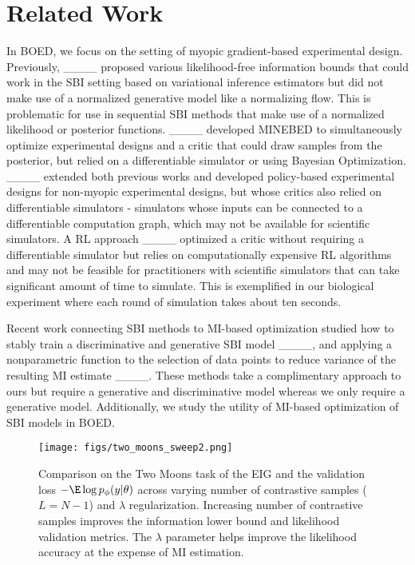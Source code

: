 \section{Related Work}
\label{sec:related_work}

In BOED, we focus on the setting of myopic gradient-based experimental design. Previously, ____ proposed various likelihood-free information bounds that could work in the SBI setting based on variational inference estimators but did not make use of a normalized generative model like a normalizing flow. This is problematic for use in sequential SBI methods that make use of a normalized likelihood or posterior functions. ____ developed MINEBED to simultaneously optimize experimental designs and a critic that could draw samples from the posterior, but relied on a differentiable simulator or using Bayesian Optimization. ____ extended both previous works and developed policy-based experimental designs for non-myopic experimental designs, but whose critics also relied on differentiable simulators - simulators whose inputs can be connected to a differentiable computation graph, which may not be available for scientific simulators. A RL approach ____ optimized a critic without requiring a differentiable simulator but relies on computationally expensive RL algorithms and may not be feasible for practitioners with scientific simulators that can take significant amount of time to simulate. This is exemplified in our biological experiment where each round of simulation takes about ten seconds. 

Recent work connecting SBI methods to MI-based optimization studied how to stably train a discriminative and generative SBI model ____, and applying a nonparametric function to the selection of data points to reduce variance of the resulting MI estimate ____. These methods take a complimentary approach to ours but require a generative and discriminative model whereas we only require a generative model. Additionally, we study the utility of MI-based optimization of SBI models in BOED.

\begin{figure*}[!t]
  \centering
  \texttt{[image: figs/two\_moons\_sweep2.png]}
  \vspace{-9pt}
  \caption{Comparison on the Two Moons task of the EIG and the validation loss $-\E \log p_\phi(y | \theta)$ across varying number of contrastive samples ($L = N - 1$) and $\lambda$ regularization. Increasing number of contrastive samples improves the information lower bound and likelihood validation metrics.  The $\lambda$ parameter helps improve the likelihood accuracy at the expense of MI estimation.
  } %
  \label{fig:two_moons}
  \vspace{-12pt}
\end{figure*}